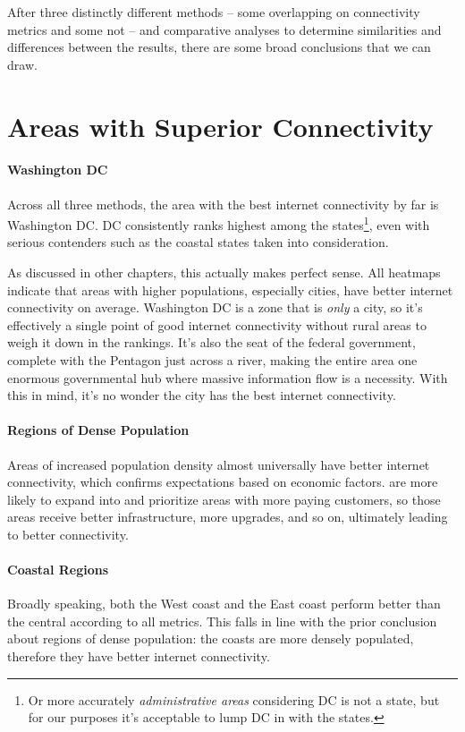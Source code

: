 After three distinctly different methods -- some overlapping on connectivity metrics and some not -- and comparative analyses to determine similarities and differences between the results, there are some broad conclusions that we can draw.

\section{Areas with Superior Connectivity}

\paragraph{Washington DC} Across all three methods, the area with the best internet connectivity by far is Washington DC. DC consistently ranks highest among the states\footnote{Or more accurately \textit{administrative areas} considering DC is not a state, but for our purposes it's acceptable to lump DC in with the states.}, even with serious contenders such as the coastal states taken into consideration.

As discussed in other chapters, this actually makes perfect sense. All heatmaps indicate that areas with higher populations, especially cities, have better internet connectivity on average. Washington DC is a zone that is \textit{only} a city, so it's effectively a single point of good internet connectivity without rural areas to weigh it down in the rankings. It's also the seat of the \us federal government, complete with the Pentagon just across a river, making the entire area one enormous governmental hub where massive information flow is a necessity. With this in mind, it's no wonder the city has the best internet connectivity.

\paragraph{Regions of Dense Population} Areas of increased population density almost universally have better internet connectivity, which confirms expectations based on economic factors. \ISPs are more likely to expand into and prioritize areas with more paying customers, so those areas receive better infrastructure, more upgrades, and so on, ultimately leading to better connectivity.

\paragraph{Coastal Regions} Broadly speaking, both the West coast and the East coast perform better than the central \us according to all metrics. This falls in line with the prior conclusion about regions of dense population: the coasts are more densely populated, therefore they have better internet connectivity.

